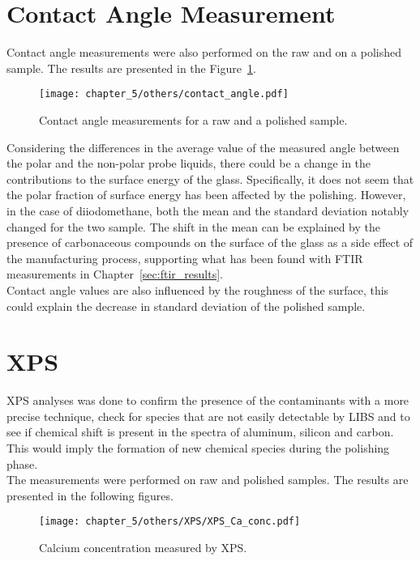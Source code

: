 \section{Contact Angle Measurement}
Contact angle measurements were also performed on the raw and on a polished sample. The results are presented in the Figure~\ref{fig:contact_angle_raw_polished}.
\begin{figure}[H]
    \centering
    \texttt{[image: chapter\_5/others/contact\_angle.pdf]} 
    \vspace*{-30pt}
    \caption{Contact angle measurements for a raw and a polished sample. }
    \label{fig:contact_angle_raw_polished}
 \end{figure}
Considering the differences in the average value of the measured angle between the polar and the non-polar probe liquids, there could be a change in the contributions to the surface energy of the glass. Specifically, it does not seem that the polar fraction of surface energy has been affected by the polishing. However, in the case of diiodomethane, both the mean and the standard deviation notably changed for the two sample. The shift in the mean can be explained by the presence of carbonaceous compounds on the surface of the glass as a side effect of the manufacturing process, supporting what has been found with FTIR measurements in Chapter~\ref{sec:ftir_results}.
\\
Contact angle values are also influenced by the roughness of the surface, this could explain the decrease in standard deviation of the polished sample.

\section{XPS}
\label{sec:xps_results}
XPS analyses was done to confirm the presence of the contaminants with a more precise technique, check for species that are not easily detectable by LIBS and to see if chemical shift is present in the spectra of aluminum, silicon and carbon. This would imply the formation of new chemical species during the polishing phase.
\\
The measurements were performed on raw and polished samples. The results are presented in the following figures.
\\


\begin{figure}[H]
   \centering
   \texttt{[image: chapter\_5/others/XPS/XPS\_Ca\_conc.pdf]} 
   \vspace*{-30pt}
   \caption{Calcium concentration measured by XPS. }
   \label{fig:ca_xps}
\end{figure}



